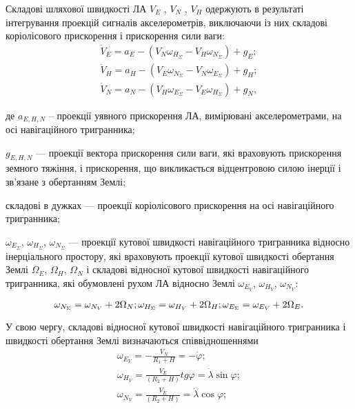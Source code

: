 Складові шляхової швидкості ЛА  $V_E$ , $V_N$ , $V_H$  одержують в результаті інтегрування 
проекцій сигналів акселерометрів, виключаючи із них  складові коріолісового прискорення  і 
прискорення сили ваги: 
\begin{equation} 
\label{eq:Vi} 
 \begin{array}{l} 
{\dot{V}_{E} =a_{E} -(V_{N} \omega_{H_{\Sigma }} -V_{H} \omega_{N_{\Sigma}} )+g_{E} ;} \\ 
{\dot{V}_{H} =a_{H} -(V_{E} \omega_{N_{\Sigma }} -V_{N} \omega_{E_{\Sigma}} )+g_{H} ;} \\ 
{\dot{V}_{N} =a_{N} -(V_{H} \omega_{E_{\Sigma }} -V_{E} \omega_{H_{\Sigma}} )+g_{N} ,} 
\end{array}
\end{equation} 
\begin{ESKDexplanation}
\item де $a_{E,H,N} $ -- проекції уявного прискорення ЛА, вимірювані акселерометрами, 
на осі навігаційного тригранника; 
\item $g_{E,H,N} $ --- проекції вектора прискорення 
сили ваги, які враховують прискорення земного тяжіння, і прискорення, що викликається 
відцентровою силою інерції і зв'язане з обертанням Землі; 
\item складові в дужках --- проекції коріолісового прискорення на осі навігаційного тригранника; 
\item $\omega_{E_{\Sigma}}$, $\omega_{H_{\Sigma}}$, $\omega_{N_{\Sigma}}$ --- проекції кутової 
швидкості навігаційного тригранника відносно інерціального простору, які враховують 
проекції кутової швидкості обертання Землі $\Omega_{E}$, $\Omega_{H}$, $\Omega_{N}$ 
і складові відносної кутової швидкості навігаційного тригранника, які обумовлені 
рухом ЛА відносно Землі $\omega_{E_{V}}$, $\omega_{H_{V}}$, $\omega_{N_{V}}$: 
\end{ESKDexplanation}
\[\omega_{N_{\Sigma }} =\omega_{N_{V}} +2\Omega_{N} ;\\ 
\omega_{H_{\Sigma }} =\omega_{H_{V}} +2\Omega_{H} ;\\
\omega_{E_{\Sigma }} =\omega_{E_{V}} +2\Omega_{E} .\] 

У свою чергу, складові відносної кутової швидкості навігаційного тригранника і швидкості 
обертання Землі визначаються співвідношеннями
\[\begin{array}{l} 
{\omega_{E_{V}} =-\frac{V_{N}}{R_{1} +H} =-\dot{\varphi};} \\ 
{\omega_{H_{V}} =\frac{V_{E}}{(R_{2} +H)} tg\varphi=\dot{\lambda}\sin \varphi;} \\ 
{\omega_{N_{V}} =\frac{V_{E}}{(R_{2} +H)} =\dot{\lambda}\cos \varphi;} \end{array}\] 


